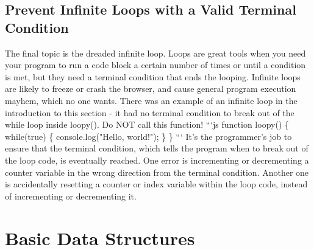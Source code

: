 \documentclass{article}%
\begin{document}
%
\subsection{Prevent Infinite Loops with a Valid Terminal Condition}%
\label{subsec:PreventInfiniteLoopswithaValidTerminalCondition}%
The final topic is the dreaded infinite loop. Loops are great tools when you need your program to run a code block a certain number of times or until a condition is met, but they need a terminal condition that ends the looping. Infinite loops are likely to freeze or crash the browser, and cause general program execution mayhem, which no one wants.\newline%
There was an example of an infinite loop in the introduction to this section {-} it had no terminal condition to break out of the while loop inside loopy(). Do NOT call this function!\newline%
```js\newline%
function loopy() \{\newline%
  while(true) \{\newline%
    console.log("Hello, world!");\newline%
  \}\newline%
\}\newline%
```\newline%
It's the programmer's job to ensure that the terminal condition, which tells the program when to break out of the loop code, is eventually reached. One error is incrementing or decrementing a counter variable in the wrong direction from the terminal condition. Another one is accidentally resetting a counter or index variable within the loop code, instead of incrementing or decrementing it.\newline%

%
\newpage%
\section{Basic Data Structures}%
\label{sec:BasicDataStructures}%
\end{document}
